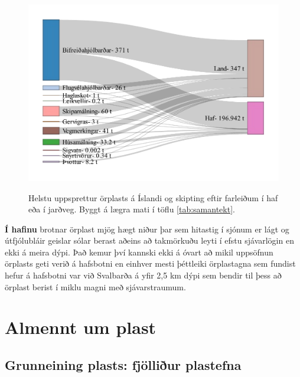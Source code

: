 \documentclass[icelandic,]{book}
\begin{document}
\begin{figure}[H]
{\centering \includegraphics{_bookdown_files/OrplastHaf_files/figure-latex/unnamed-chunk-6-1}}
\caption{Helstu uppsprettur örplasts á Íslandi og skipting eftir farleiðum í haf eða í jarðveg. Byggt á lægra mati í töflu \ref{tab:samantekt}.}\label{fig:samant}
\end{figure}

\textbf{Í hafinu} brotnar örplast mjög hægt niður þar sem hitastig í sjónum er lágt og útfjólubláir geislar sólar berast aðeins að takmörkuðu leyti í efstu sjávarlögin en ekki á meira dýpi. Það kemur því kannski ekki á óvart að mikil uppsöfnun örplasts geti verið á hafsbotni en einhver mesti þéttleiki örplastagna sem fundist hefur á hafsbotni var við Svalbarða á yfir 2,5 km dýpi sem bendir til þess að örplast berist í miklu magni með sjávarstraumum.



\hypertarget{almennt-um-plast}{%
\chapter{Almennt um plast}\label{almennt-um-plast}}
\pagestyle{headings}
\setcounter{tocdepth}{1}
\hypertarget{grunneining-plasts-fjolliur-plastefna}{%
\section*{Grunneining plasts: fjölliður plastefna}\label{grunneining-plasts-fjolliur-plastefna}}
\end{document}
